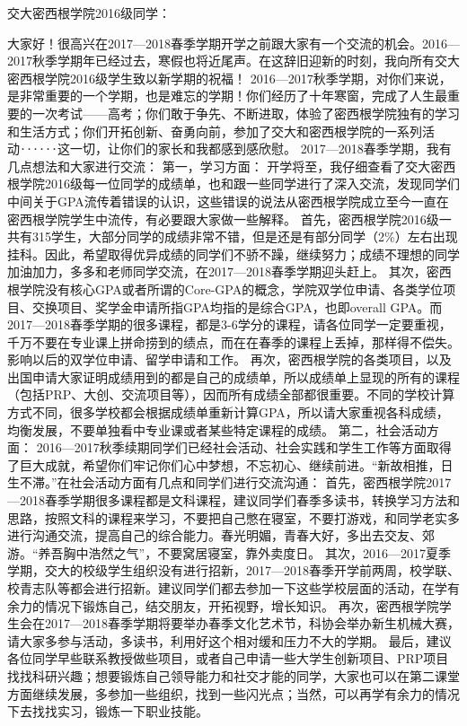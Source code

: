 \documentclass[11pt]{article}
\begin{document}
交大密西根学院2016级同学：

大家好！很高兴在2017—2018春季学期开学之前跟大家有一个交流的机会。2016—2017秋季学期年已经过去，寒假也将近尾声。在这辞旧迎新的时刻，我向所有交大密西根学院2016级学生致以新学期的祝福！
2016—2017秋季学期，对你们来说，是非常重要的一个学期，也是难忘的学期！你们经历了十年寒窗，完成了人生最重要的一次考试——高考；你们敢于争先、不断进取，体验了密西根学院独有的学习和生活方式；你们开拓创新、奋勇向前，参加了交大和密西根学院的一系列活动‥‥‥这一切，让你们的家长和我都感到感欣慰。
2017—2018春季学期，我有几点想法和大家进行交流：
第一，学习方面：
开学将至，我仔细查看了交大密西根学院2016级每一位同学的成绩单，也和跟一些同学进行了深入交流，发现同学们中间关于GPA流传着错误的认识，这些错误的说法从密西根学院成立至今一直在密西根学院学生中流传，有必要跟大家做一些解释。
首先，密西根学院2016级一共有315学生，大部分同学的成绩非常不错，但是还是有部分同学（2\%）左右出现挂科。因此，希望取得优异成绩的同学们不骄不躁，继续努力；成绩不理想的同学加油加力，多多和老师同学交流，在2017—2018春季学期迎头赶上。
其次，密西根学院没有核心GPA或者所谓的Core-GPA的概念，学院双学位申请、各类学位项目、交换项目、奖学金申请所指GPA均指的是综合GPA，也即overall GPA。而2017—2018春季学期的很多课程，都是3-6学分的课程，请各位同学一定要重视，千万不要在专业课上拼命捞到的绩点，而在在春季的课程上丢掉，那样得不偿失。影响以后的双学位申请、留学申请和工作。
再次，密西根学院的各类项目，以及出国申请大家证明成绩用到的都是自己的成绩单，所以成绩单上显现的所有的课程（包括PRP、大创、交流项目等），因而所有成绩全部都很重要。不同的学校计算方式不同，很多学校都会根据成绩单重新计算GPA，所以请大家重视各科成绩，均衡发展，不要单独看中专业课或者某些特定课程的成绩。
第二，社会活动方面：
2016—2017秋季续期同学们已经社会活动、社会实践和学生工作等方面取得了巨大成就，希望你们牢记你们心中梦想，不忘初心、继续前进。“新故相推，日生不滞。”在社会活动方面有几点和同学们进行交流沟通：
首先，密西根学院2017—2018春季学期很多课程都是文科课程，建议同学们春季多读书，转换学习方法和思路，按照文科的课程来学习，不要把自己憋在寝室，不要打游戏，和同学老实多进行沟通交流，提高自己的综合能力。春光明媚，青春大好，多出去交友、郊游。“养吾胸中浩然之气”，不要窝居寝室，靠外卖度日。
 其次，2016—2017夏季学期，交大的校级学生组织没有进行招新，2017—2018春季开学前两周，校学联、校青志队等都会进行招新。建议同学们都去参加一下这些学校层面的活动，在学有余力的情况下锻炼自己，结交朋友，开拓视野，增长知识。
再次，密西根学院学生会在2017—2018春季学期将要举办春季文化艺术节，科协会举办新生机械大赛，请大家多参与活动，多读书，利用好这个相对缓和压力不大的学期。
最后，建议各位同学早些联系教授做些项目，或者自己申请一些大学生创新项目、PRP项目找找科研兴趣；想要锻炼自己领导能力和社交才能的同学，大家也可以在第二课堂方面继续发展，多参加一些组织，找到一些闪光点；当然，可以再学有余力的情况下去找找实习，锻炼一下职业技能。
\end{document}

